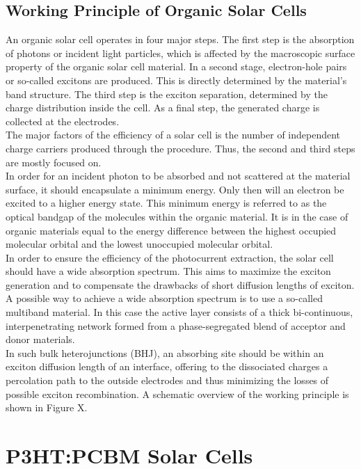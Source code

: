 \documentclass[letterpaper, 10 pt, conference]{ieeeconf}
\begin{document}
\subsection{Working Principle of Organic Solar Cells}

 An organic solar cell operates in four major steps. The first step is the absorption of photons or incident light particles, which is affected by the macroscopic surface property of the organic solar cell material. In a second stage, electron-hole pairs or so-called excitons are produced. This is directly determined by the material’s band structure. The third step is the exciton separation, determined by the charge distribution inside the cell. As a final step, the generated charge is collected at the electrodes. \\
 The major factors of the efficiency of a solar cell is the number of independent charge carriers produced through the procedure. Thus, the second and third steps are mostly focused on. \\
 In order for an incident photon to be absorbed and not scattered at the material surface, it should encapsulate a minimum energy. Only then will an electron be excited to a higher energy state. This minimum energy is referred to as the optical bandgap of the molecules within the organic material. It is in the case of organic materials equal to the energy difference between the highest occupied molecular orbital and the lowest unoccupied molecular orbital. \\
 In order to ensure the efficiency of the photocurrent extraction, the solar cell should have a wide absorption spectrum. This aims to maximize the exciton generation and to compensate the drawbacks of short diffusion lengths of exciton. A possible way to achieve a wide absorption spectrum is to use a so-called multiband material. In this case the active layer consists of a thick bi-continuous, interpenetrating network formed from a phase-segregated blend of acceptor and donor materials.\\
 In such bulk heterojunctions (BHJ), an absorbing site should be within an exciton diffusion length of an interface, offering to the dissociated charges a percolation path to the outside electrodes and thus minimizing the losses of possible exciton recombination. A schematic overview of the working principle is shown in Figure X. 


\section{P3HT:PCBM Solar Cells}
\end{document}
